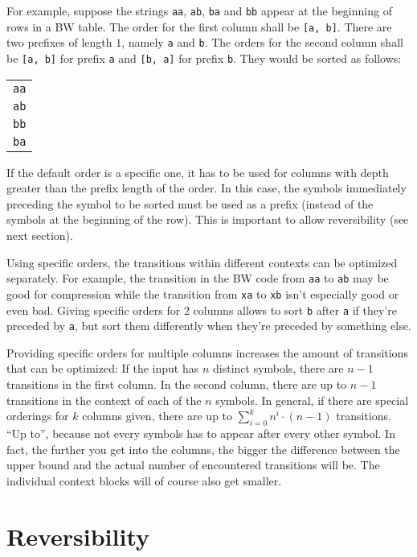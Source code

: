\documentclass[a4paper]{scrreprt}
\begin{document}
For example, suppose the strings \texttt{aa}, \texttt{ab}, \texttt{ba} and
\texttt{bb} appear at the beginning of rows in a BW table. The order for the
first column shall be \texttt{[a, b]}. There are two prefixes of length \(1\),
namely \texttt{a} and \texttt{b}. The orders for the second column shall be
\texttt{[a, b]} for prefix \texttt{a} and \texttt{[b, a]} for prefix \texttt{b}.
They would be sorted as follows:

\begin{tabular}{c}
\texttt{aa} \\
\texttt{ab} \\
\texttt{bb} \\ 
\texttt{ba} \\
\end{tabular}

If the default order is a specific one, it has to be used for columns with depth
greater than the prefix length of the order. In this case, the symbols
immediately preceding the symbol to be sorted must be used as a prefix (instead
of the symbols at the beginning of the row). This is important to allow
reversibility (see next section).

Using specific orders, the transitions within different contexts can be
optimized separately. For example, the transition in the BW code from
\texttt{aa} to \texttt{ab} may be good for compression while the transition
from \texttt{xa} to \texttt{xb} isn't especially good or even bad. Giving
specific orders for 2 columns allows to sort \texttt{b} after \texttt{a} if
they're preceded by \texttt{a}, but sort them differently when they're preceded
by something else.

Providing specific orders for multiple columns increases the amount of
transitions that can be optimized: If the input has \(n\) distinct symbols,
there are \(n - 1\) transitions in the first column. In the second column, there
are up to \(n - 1\) transitions in the context of each of the \(n\) symbols. In
general, if there are special orderings for \(k\) columns given, there are up to
\(\sum_{i=0}^{k} n^{i} \cdot (n - 1)\) transitions. ``Up to'', because not every
symbols has to appear after every other symbol. In fact, the further you get
into the columns, the bigger the difference between the upper bound and the
actual number of encountered transitions will be. The individual context blocks
will of course also get smaller.


\section{Reversibility}
\end{document}
